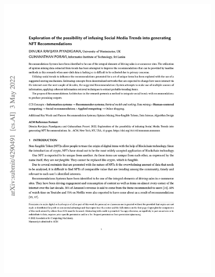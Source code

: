 \begin{figure}[h!]
\centering
\includegraphics[height=0.83\textheight]{images/appendix/papers/trends/Exploration of the possibility of infusing Social Media Trends into generating NFT Recommendations.jpeg}
\end{figure}

